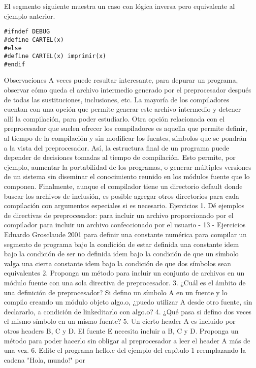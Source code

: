 El segmento siguiente muestra un caso con lógica inversa pero equivalente al ejemplo anterior.
\begin{lstlisting}
#ifndef DEBUG
#define CARTEL(x)
#else
#define CARTEL(x) imprimir(x)
#endif
\end{lstlisting}

Observaciones
A veces puede resultar interesante, para depurar un programa, observar cómo queda el archivo
intermedio generado por el preprocesador después de todas las sustituciones, inclusiones, etc. La
mayoría de los compiladores cuentan con una opción que permite generar este archivo intermedio y
detener allí la compilación, para poder estudiarlo.
Otra opción relacionada con el preprocesador que suelen ofrecer los compiladores es aquella que
permite definir, al tiempo de la compilación y sin modificar los fuentes, símbolos que se pondrán a la
vista del preprocesador. Así, la estructura final de un programa puede depender de decisiones tomadas
al tiempo de compilación. Esto permite, por ejemplo, aumentar la portabilidad de los programas, o
generar múltiples versiones de un sistema sin diseminar el conocimiento reunido en los módulos
fuente que lo componen.
Finalmente, aunque el compilador tiene un directorio default donde buscar los archivos de inclusión,
es posible agregar otros directorios para cada compilación con argumentos especiales si es necesario.
Ejercicios
1. Dé ejemplos de directivas de preprocesador:
para incluir un archivo proporcionado por el compilador
para incluir un archivo confeccionado por el usuario
- 13 -
Ejercicios
Eduardo Grosclaude 2001
para definir una constante numérica
para compilar un segmento de programa bajo la condición de estar definida una constante
idem bajo la condición de ser no definida
idem bajo la condición de que un símbolo valga una cierta constante
idem bajo la condición de que dos símbolos sean equivalentes
2. Proponga un método para incluir un conjunto de archivos en un módulo fuente con una sola
directiva de preprocesador.
3. ¿Cuál es el ámbito de una definición de preprocesador? Si defino un símbolo A en un fuente y lo
compilo creando un módulo objeto algo.o, ¿puedo utilizar A desde otro fuente, sin declararlo, a
condición de linkeditarlo con algo.o?
4. ¿Qué pasa si defino dos veces el mismo símbolo en un mismo fuente?
5. Un cierto header A es incluido por otros headers B, C y D. El fuente E necesita incluir a B, C y D.
Proponga un método para poder hacerlo sin obligar al preprocesador a leer el header A más de una
vez.
6. Edite el programa hello.c del ejemplo del capítulo 1 reemplazando la cadena "Hola, mundo!\n" por
